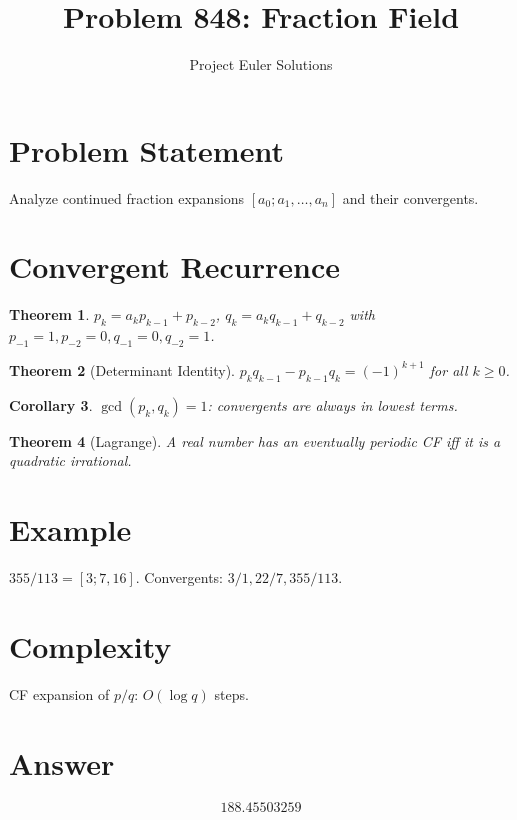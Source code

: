 \documentclass[11pt]{article}
\title{Problem 848: Fraction Field}
\author{Project Euler Solutions}
\date{}
\newtheorem{theorem}{Theorem}
\newtheorem{corollary}[theorem]{Corollary}
\begin{document}
\maketitle

\section{Problem Statement}
Analyze continued fraction expansions $[a_0; a_1, \ldots, a_n]$ and their convergents.

\section{Convergent Recurrence}

\begin{theorem}
$p_k = a_k p_{k-1} + p_{k-2}$, $q_k = a_k q_{k-1} + q_{k-2}$ with $p_{-1}=1, p_{-2}=0, q_{-1}=0, q_{-2}=1$.
\end{theorem}

\begin{theorem}[Determinant Identity]
$p_k q_{k-1} - p_{k-1}q_k = (-1)^{k+1}$ for all $k \ge 0$.
\end{theorem}

\begin{corollary}
$\gcd(p_k, q_k) = 1$: convergents are always in lowest terms.
\end{corollary}

\begin{theorem}[Lagrange]
A real number has an eventually periodic CF iff it is a quadratic irrational.
\end{theorem}

\section{Example}
$355/113 = [3; 7, 16]$. Convergents: $3/1, 22/7, 355/113$.

\section{Complexity}
CF expansion of $p/q$: $O(\log q)$ steps.

\section{Answer}

\[
\boxed{188.45503259}
\]
\end{document}
